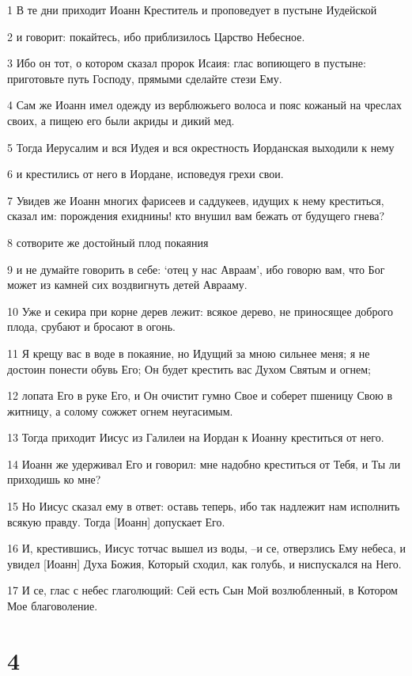 \par 1 В те дни приходит Иоанн Креститель и проповедует в пустыне Иудейской
\par 2 и говорит: покайтесь, ибо приблизилось Царство Небесное.
\par 3 Ибо он тот, о котором сказал пророк Исаия: глас вопиющего в пустыне: приготовьте путь Господу, прямыми сделайте стези Ему.
\par 4 Сам же Иоанн имел одежду из верблюжьего волоса и пояс кожаный на чреслах своих, а пищею его были акриды и дикий мед.
\par 5 Тогда Иерусалим и вся Иудея и вся окрестность Иорданская выходили к нему
\par 6 и крестились от него в Иордане, исповедуя грехи свои.
\par 7 Увидев же Иоанн многих фарисеев и саддукеев, идущих к нему креститься, сказал им: порождения ехиднины! кто внушил вам бежать от будущего гнева?
\par 8 сотворите же достойный плод покаяния
\par 9 и не думайте говорить в себе: `отец у нас Авраам', ибо говорю вам, что Бог может из камней сих воздвигнуть детей Аврааму.
\par 10 Уже и секира при корне дерев лежит: всякое дерево, не приносящее доброго плода, срубают и бросают в огонь.
\par 11 Я крещу вас в воде в покаяние, но Идущий за мною сильнее меня; я не достоин понести обувь Его; Он будет крестить вас Духом Святым и огнем;
\par 12 лопата Его в руке Его, и Он очистит гумно Свое и соберет пшеницу Свою в житницу, а солому сожжет огнем неугасимым.
\par 13 Тогда приходит Иисус из Галилеи на Иордан к Иоанну креститься от него.
\par 14 Иоанн же удерживал Его и говорил: мне надобно креститься от Тебя, и Ты ли приходишь ко мне?
\par 15 Но Иисус сказал ему в ответ: оставь теперь, ибо так надлежит нам исполнить всякую правду. Тогда [Иоанн] допускает Его.
\par 16 И, крестившись, Иисус тотчас вышел из воды, --и се, отверзлись Ему небеса, и увидел [Иоанн] Духа Божия, Который сходил, как голубь, и ниспускался на Него.
\par 17 И се, глас с небес глаголющий: Сей есть Сын Мой возлюбленный, в Котором Мое благоволение.

\chapter{4}

